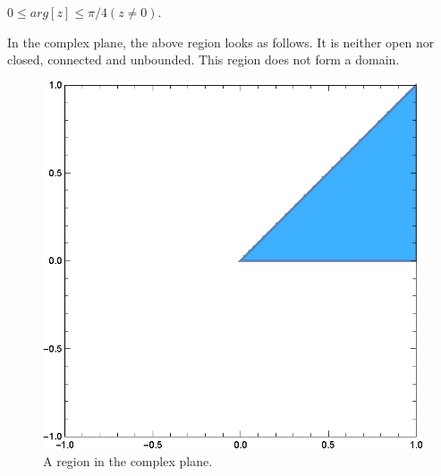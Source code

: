 \documentclass[12pt]{book}
\begin{document}
\begin{exmp}
    $0 \leq arg[z] \leq \pi / 4 (z \neq 0).$
\end{exmp}
In the complex plane, the above region looks as follows. It is neither open nor closed, connected and unbounded. This region does not form a domain.
\begin{figure}[H]
    \centering
    \includegraphics[scale = 0.7]{./figs/chapter_1/region_plot_3.eps}
    \caption{A region in the complex plane.}
\end{figure}
\end{document}
